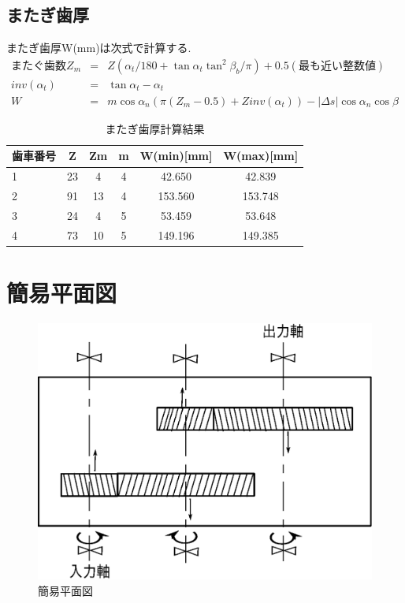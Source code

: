 \subsection{またぎ歯厚}
またぎ歯厚W(mm)は次式で計算する.
\begin{eqnarray}
またぐ歯数　Z_m &=& Z(\alpha_t/180 + \tan \alpha_t \tan^2 \beta_b/\pi) + 0.5 (最も近い整数値)\\
inv(\alpha_t) &=& \tan \alpha_t - \alpha_t\\
W &=& m\cos \alpha_n(\pi (Z_m - 0.5) + Zinv(\alpha_t)) - | \Delta s |\cos \alpha_n \cos \beta
\end{eqnarray}
\begin{table}[htb]
\begin{center}
  \caption{またぎ歯厚計算結果}
  \begin{tabular}{|l||c|c|c|c|c|} \hline
歯車番号&Z&Zm&m&W(min)[mm]&W(max)[mm]\\\hline
1&23& 4&  4& 42.650& 42.839\\
2&91&13&  4&153.560&153.748\\
3&24& 4&  5& 53.459& 53.648\\
4&73&10&  5&149.196&149.385\\
\hline
  \end{tabular}
\end{center}
\end{table}
\newpage
\section{簡易平面図}
\begin{figure}[htbp]
\begin{center}
\includegraphics[width=12cm]{../picture/hagu.eps}
\end{center}
\caption{簡易平面図}
\end{figure}